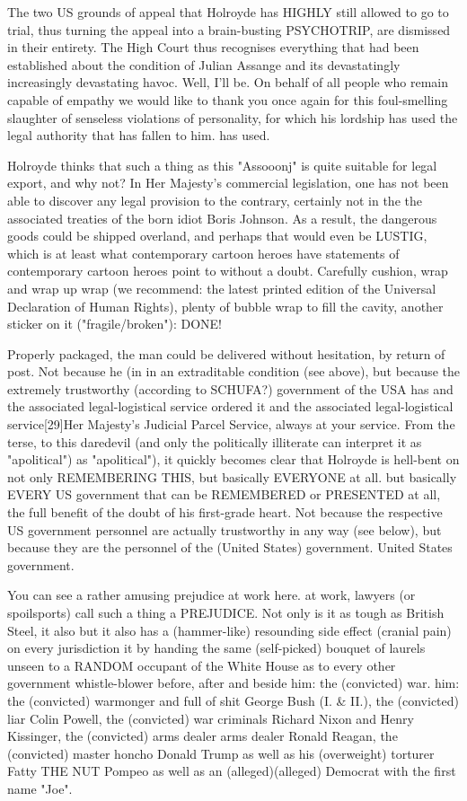 \begin{multicols}{2}
The two US grounds of appeal that Holroyde has HIGHLY still allowed to go to trial, thus turning the
appeal into a brain-busting PSYCHOTRIP, are dismissed in their entirety. The High Court thus
recognises everything that had been established about the condition of Julian Assange and its
devastatingly increasingly devastating havoc. Well, I'll be. On behalf of all people who remain
capable of empathy we would like to thank you once again for this foul-smelling slaughter of
senseless violations of personality, for which his lordship has used the legal authority that has
fallen to him. has used.

Holroyde thinks that such a thing as this "Assooonj" is quite suitable for legal export, and why
not? In Her Majesty's commercial legislation, one has not been able to discover any legal provision
to the contrary, certainly not in the the associated treaties of the born idiot Boris Johnson. As a
result, the dangerous goods could be shipped overland, and perhaps that would even be LUSTIG, which
is at least what contemporary cartoon heroes have statements of contemporary cartoon heroes point
to without a doubt. Carefully cushion, wrap and wrap up wrap (we recommend: the latest printed
edition of the Universal Declaration of Human Rights), plenty of bubble wrap to fill the cavity,
another sticker on it ("fragile/broken"): DONE!

Properly packaged, the man could be delivered without hesitation, by return of post. Not because he
(in in an extraditable condition (see above), but because the extremely trustworthy (according to
SCHUFA?) government of the USA has and the associated legal-logistical service ordered it and the
associated legal-logistical service[29]{Her Majesty's Judicial Parcel Service, always at your
service}. From the terse, to this daredevil (and only the politically illiterate can interpret it
as "apolitical") as "apolitical"), it quickly becomes clear that Holroyde is hell-bent on not only
REMEMBERING THIS, but basically EVERYONE at all. but basically EVERY US government that can be
REMEMBERED or PRESENTED at all, the full benefit of the doubt of his first-grade heart. Not because
the respective US government personnel are actually trustworthy in any way (see below), but because
they are the personnel of the (United States) government. United States government.

You can see a rather amusing prejudice at work here. at work, lawyers (or spoilsports) call such a
thing a PREJUDICE. Not only is it as tough as British Steel, it also but it also has a
(hammer-like) resounding side effect (cranial pain) on every jurisdiction it by handing the same
(self-picked) bouquet of laurels unseen to a RANDOM occupant of the White House as to every other
government whistle-blower before, after and beside him: the (convicted) war. him: the
(convicted) warmonger and full of shit George Bush (I. \& II.), the (convicted) liar Colin Powell,
the (convicted) war criminals Richard Nixon and Henry Kissinger, the (convicted) arms dealer arms
dealer Ronald Reagan, the (convicted) master honcho Donald Trump as well as his
(overweight) torturer Fatty THE NUT Pompeo as well as an (alleged)(alleged) Democrat with the first
name "Joe".


\end{multicols}
